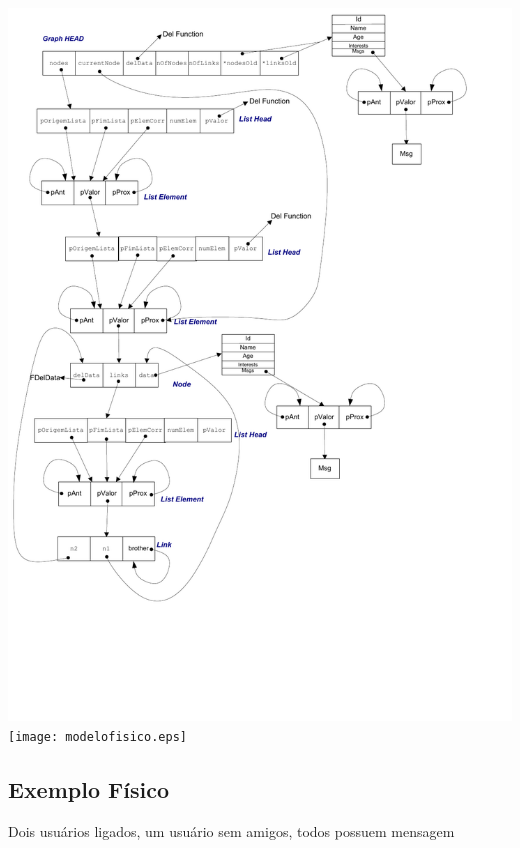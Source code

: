 \documentclass[a4paper,8pt]{article}
\begin{document}
\ifpdf
\includegraphics[width=\linewidth]{modelofisico.pdf}
\else
\texttt{[image: modelofisico.eps]}
\fi

\pagebreak
\subsection{Exemplo Físico}

Dois usuários ligados, um usuário sem amigos, todos possuem mensagem
\end{document}
